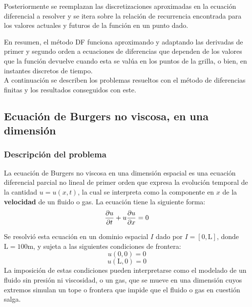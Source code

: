 \documentclass[12pt]{article}
\begin{document}
	Posteriormente se reemplazan las discretizaciones aproximadas en la ecuación diferencial a resolver y se itera sobre la relación de recurrencia encontrada para los valores actuales y futuros de la función en un punto dado. 
	
	En resumen, el método DF funciona aproximando y adaptando las derivadas de primer y segundo orden a ecuaciones de diferencias que dependen de los valores que la función devuelve cuando esta se valúa en los puntos de la grilla, o bien, en instantes discretos de tiempo.\\
	
	A continuación se describen los problemas resueltos con el método de diferencias finitas y los resultados conseguidos con este.

	
	\subsection{Ecuación de Burgers no viscosa, en una dimensión}
	\label{sec:burgers1ddf}
	\subsubsection{Descripción del problema}
	La ecuación de Burgers no viscosa en una dimensión espacial es una ecuación diferencial parcial no lineal de primer orden que expresa la evolución temporal de la cantidad $u = u(x,t)$, la cual se interpreta como la componente en $x$ de la \textbf{velocidad} de un fluido o gas. La ecuación tiene la siguiente forma:
	\begin{equation}
		\pdv{u}{t}+u\pdv{u}{x}=0
		\label{eq:burgers1d}
	\end{equation}
	
	Se resolvió esta ecuación en un dominio espacial $I$ dado por $I = [0,\text{L}]$, donde $\text{L} = 100 \unit{\meter}$, y sujeta a las siguientes condiciones de frontera:\\
	\begin{equation}
		u(0,0)=0
	\end{equation}
	\begin{equation}
		u(\text{L},0)= 0
	\end{equation}
	La imposición de estas condiciones pueden interpretarse como el modelado de un fluido sin presión ni viscosidad, o un gas, que se mueve en una dimensión cuyos extremos simulan un tope o frontera que impide que el fluido o gas en cuestión salga. 
	
\end{document}
